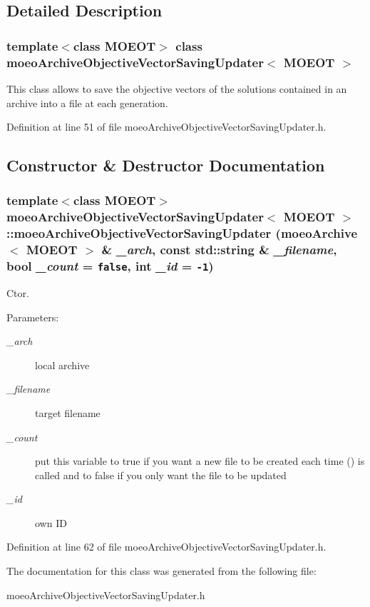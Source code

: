 \subsection{Detailed Description}
\subsubsection*{template$<$class MOEOT$>$ class moeo\-Archive\-Objective\-Vector\-Saving\-Updater$<$ MOEOT $>$}

This class allows to save the objective vectors of the solutions contained in an archive into a file at each generation. 



Definition at line 51 of file moeo\-Archive\-Objective\-Vector\-Saving\-Updater.h.

\subsection{Constructor \& Destructor Documentation}
\subsubsection{\setlength{\rightskip}{0pt plus 5cm}template$<$class MOEOT$>$ \bf{moeo\-Archive\-Objective\-Vector\-Saving\-Updater}$<$ MOEOT $>$::\bf{moeo\-Archive\-Objective\-Vector\-Saving\-Updater} (\bf{moeo\-Archive}$<$ MOEOT $>$ \& {\em \_\-arch}, const std::string \& {\em \_\-filename}, bool {\em \_\-count} = {\tt false}, int {\em \_\-id} = {\tt -1})\hspace{0.3cm}{\tt  [inline]}}\label{classmoeoArchiveObjectiveVectorSavingUpdater_d9f70d24605ccd1e89c8b4ea4c96c333}


Ctor. 

\begin{Desc}
\item[Parameters:]
\begin{description}
\item[{\em \_\-arch}]local archive \item[{\em \_\-filename}]target filename \item[{\em \_\-count}]put this variable to true if you want a new file to be created each time () is called and to false if you only want the file to be updated \item[{\em \_\-id}]own ID \end{description}
\end{Desc}


Definition at line 62 of file moeo\-Archive\-Objective\-Vector\-Saving\-Updater.h.

The documentation for this class was generated from the following file:\begin{CompactItemize}
\item 
moeo\-Archive\-Objective\-Vector\-Saving\-Updater.h\end{CompactItemize}
